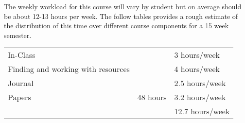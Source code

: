 \documentclass[]{tufte-handout}
\begin{document}
The weekly workload for this course will vary by student but on average should be about 12-13 hours per week.  The follow tables provides a rough estimate of the distribution of this time over different course components for a 15 week semester. 
\begin{center}
\begin{tabular}{|l|l|l|}
\hline
In-Class &      & 3 hours/week \\ 
Finding and working with resources &        & 4 hours/week \\
Journal &   & 2.5 hours/week \\ 
Papers & 48 hours & 3.2 hours/week \\
\hline 
& & 12.7 hours/week \\ 
\hline
\end{tabular}
\end{center}

    
\end{document}
